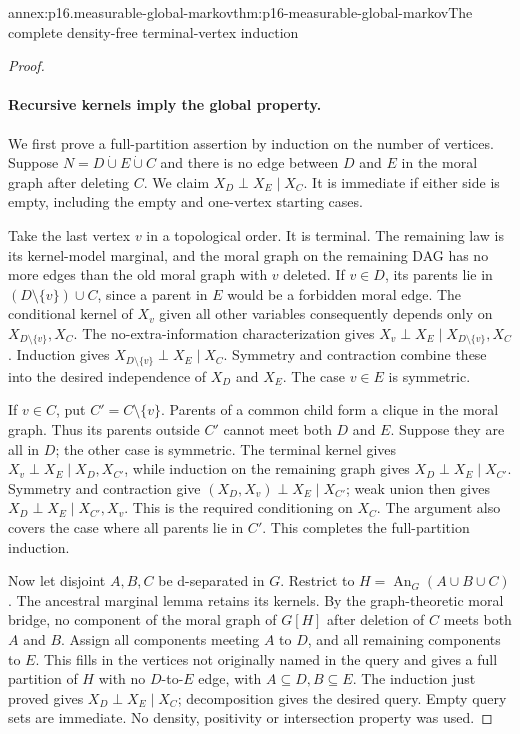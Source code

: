 \begin{annexitem}{annex:p16.measurable-global-markov}{thm:p16-measurable-global-markov}{The complete density-free terminal-vertex induction}
\begin{proof}
\paragraph{Recursive kernels imply the global property.}
We first prove a full-partition assertion by induction on the number
of vertices. Suppose \(N=D\mathbin{\dot\cup}E\mathbin{\dot\cup}C\)
and there is no edge between \(D\) and \(E\) in the moral graph
after deleting \(C\). We claim \(X_D\perp X_E\mid X_C\).
It is immediate if either side is empty, including the empty and
one-vertex starting cases.

Take the last vertex \(v\) in a topological order. It is terminal.
The remaining law is its kernel-model marginal, and the moral graph
on the remaining DAG has no more edges than the old moral graph
with \(v\) deleted. If \(v\in D\), its parents lie in
\((D\setminus\{v\})\cup C\), since a parent in \(E\) would be
a forbidden moral edge. The conditional kernel of \(X_v\) given
all other variables consequently depends only on
\(X_{D\setminus\{v\}},X_C\). The no-extra-information
characterization gives
\(X_v\perp X_E\mid X_{D\setminus\{v\}},X_C\).
Induction gives \(X_{D\setminus\{v\}}\perp X_E\mid X_C\).
Symmetry and contraction combine these into the desired independence
of \(X_D\) and \(X_E\). The case \(v\in E\) is symmetric.

If \(v\in C\), put \(C'=C\setminus\{v\}\). Parents of a
common child form a clique in the moral graph. Thus its parents
outside \(C'\) cannot meet both \(D\) and \(E\). Suppose they
are all in \(D\); the other case is symmetric. The terminal kernel
gives \(X_v\perp X_E\mid X_D,X_{C'}\), while induction on the
remaining graph gives \(X_D\perp X_E\mid X_{C'}\). Symmetry and
contraction give \((X_D,X_v)\perp X_E\mid X_{C'}\); weak union
then gives \(X_D\perp X_E\mid X_{C'},X_v\). This is the required
conditioning on \(X_C\). The argument also covers the case where
all parents lie in \(C'\). This completes the full-partition induction.

Now let disjoint \(A,B,C\) be d-separated in \(G\). Restrict to
\(H=\operatorname{An}_G(A\cup B\cup C)\). The ancestral marginal
lemma retains its kernels. By the graph-theoretic moral bridge, no
component of the moral graph of \(G[H]\) after deletion of \(C\)
meets both \(A\) and \(B\). Assign all components meeting \(A\)
to \(D\), and all remaining components to \(E\). This fills in
the vertices not originally named in the query and gives a full
partition of \(H\) with no \(D\)-to-\(E\) edge, with
\(A\subseteq D,B\subseteq E\). The induction just proved gives
\(X_D\perp X_E\mid X_C\); decomposition gives the desired query.
Empty query sets are immediate. No density, positivity or intersection
property was used.


\end{proof}
\end{annexitem}
